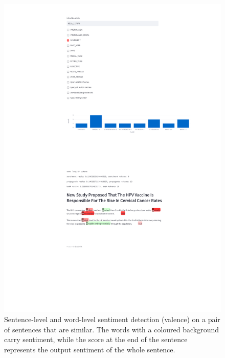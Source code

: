 \begin{figure}[!htbp]
    \centering
    \includegraphics[width=\linewidth]{figures/updated_annotation_212_sentiment_cropped.pdf}
    \caption{Sentence-level and word-level sentiment detection (valence) on a pair of sentences that are similar. The words with a coloured background carry sentiment, while the score at the end of the sentence represents the output sentiment of the whole sentence.}
    \label{fig:example_sentiment}
\end{figure}

